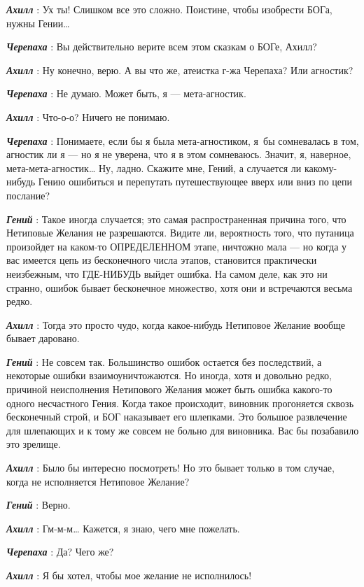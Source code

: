 \emph{\textbf{Ахилл}} : Ух ты! Слишком все это сложно. Поистине, чтобы изобрести БОГа, нужны Гении\ldots{}

\emph{\textbf{Черепаха}} : Вы действительно верите всем этом сказкам о БОГе, Ахилл?

\emph{\textbf{Ахилл}} : Ну конечно, верю. А вы что же, атеистка г-жа Черепаха? Или агностик?

\emph{\textbf{Черепаха}} : Не думаю. Может быть, я --- мета-агностик.

\emph{\textbf{Ахилл}} : Что-о-о? Ничего не понимаю.

\emph{\textbf{Черепаха}} : Понимаете, если бы я была мета-агностиком, я~бы сомневалась в том, агностик ли я --- но я не уверена, что я в этом сомневаюсь. Значит, я, наверное, мета-мета-агностик\ldots{} Ну, ладно. Скажите мне, Гений, а случается ли какому-нибудь Гению ошибиться и перепутать путешествующее вверх или вниз по цепи послание?

\emph{\textbf{Гений}} : Такое иногда случается; это самая распространенная причина того, что Нетиповые Желания не разрешаются. Видите ли, вероятность того, что путаница произойдет на каком-то ОПРЕДЕЛЕННОМ этапе, ничтожно мала --- но когда у вас имеется цепь из бесконечного числа этапов, становится практически неизбежным, что ГДЕ-НИБУДЬ выйдет ошибка. На самом деле, как это ни странно, ошибок бывает бесконечное множество, хотя они и встречаются весьма редко.

\emph{\textbf{Ахилл}} : Тогда это просто чудо, когда какое-нибудь Нетиповое Желание вообще бывает даровано.

\emph{\textbf{Гений}} : Не совсем так. Большинство ошибок остается без последствий, а некоторые ошибки взаимоуничтожаются. Но иногда, хотя и довольно редко, причиной неисполнения Нетипового Желания может быть ошибка какого-то одного несчастного Гения. Когда такое происходит, виновник прогоняется сквозь бесконечный строй, и БОГ наказывает его шлепками. Это большое развлечение для шлепающих и к тому же совсем не больно для виновника. Вас бы позабавило это зрелище.

\emph{\textbf{Ахилл}} : Было бы интересно посмотреть! Но это бывает только в том случае, когда не исполняется Нетиповое Желание?

\emph{\textbf{Гений}} : Верно.

\emph{\textbf{Ахилл}} : Гм-м-м\ldots{} Кажется, я знаю, чего мне пожелать.

\emph{\textbf{Черепаха}} : Да? Чего же?

\emph{\textbf{Ахилл}} : Я бы хотел, чтобы мое желание не исполнилось!

